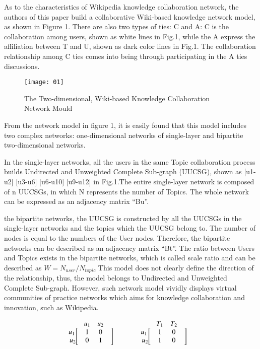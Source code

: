 \documentclass{elsarticle}
\begin{document}
As to the characteristics of Wikipedia knowledge collaboration network, the authors of this paper build a collaborative Wiki-based knowledge network model, as shown in Figure 1. There are also two types of ties: C and A: C is the collaboration among users, shown as white lines in Fig.1, while the A express the affiliation between T and U, shown as dark color lines in Fig.1. The collaboration relationship among C ties comes into being through participating in the A ties discussions.  

\begin{figure}[h]
  \centering
  \texttt{[image: 01]}
  \caption{The Two-dimensional, Wiki-based Knowledge Collaboration Network Mould}
\end{figure}

From the network model in figure 1, it is easily found that this model
includes two complex networks: one-dimensional networks of
single-layer and bipartite two-dimensional networks. 

In the single-layer networks, all the users in the same Topic collaboration process builds Undirected and Unweighted Complete Sub-graph (UUCSG), shown as [u1-u2] [u3-u6] [u6-u10] [u9-u12] in Fig.1.The entire single-layer network is composed of n UUCSGs, in which N represents the number of Topics. The whole network can be expressed as an adjacency matrix “Bu”.

 the bipartite networks, the UUCSG is constructed by all the UUCSGs in
 the single-layer networks and the topics which the UUCSG belong
 to. The number of nodes is equal to the numbers of the User
 nodes. Therefore, the bipartite networks can be described as an
 adjacency matrix “Bt”. The ratio between Users and Topics exists in
 the bipartite networks, which is called scale ratio and can be
 described as
 \begin{math}
 W = N_{user}/N_{topic}   
 \end{math}
This model does not clearly define the direction of the relationship, thus, the model belongs to Undirected and Unweighted Complete Sub-graph. However, such network model vividly displays virtual communities of practice networks which aims for knowledge collaboration and innovation, such as Wikipedia.



\begin{align*}
  \begin{matrix} 
 &u_1 & u_2 \\  
 u_1\ldelim[{2}{0.1cm}&1&0&\rdelim]{2}{0.1cm}\\
 u_2 &0&1\\
\end{matrix}
& \qquad \qquad 
\begin{matrix}  & T_1 & T_2 \\ 
 u_1\ldelim[{2}{0.1cm}&1&0&\rdelim]{2}{0.1cm}\\
 u_2&1&0 \\
\end{matrix}
\end{align*}
\end{document}
